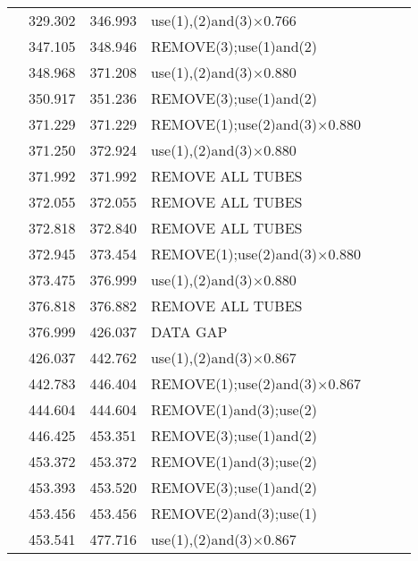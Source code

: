 \begin{table}[!h]
\begin{tabular}{ | c | c | c | p{5.5cm} | c | c | c |}
    &   329.302 &   346.993 &   use(1),(2)and(3)$\times$0.766  &       &       &       \\
    &   347.105 &   348.946 &   REMOVE(3);use(1)and(2)  &       &       &       \\
    &   348.968 &   371.208 &   use(1),(2)and(3)$\times$0.880  &       &       &       \\
    &   350.917 &   351.236 &   REMOVE(3);use(1)and(2)  &       &       &       \\
    &   371.229 &   371.229 &   REMOVE(1);use(2)and(3)$\times$0.880    &       &       &       \\
    &   371.250 &   372.924 &   use(1),(2)and(3)$\times$0.880  &       &       &       \\
    &   371.992 &   371.992 &   REMOVE ALL TUBES    &       &       &       \\
    &   372.055 &   372.055 &   REMOVE ALL TUBES    &       &       &       \\
    &   372.818 &   372.840 &   REMOVE ALL TUBES    &       &       &       \\
    &   372.945 &   373.454 &   REMOVE(1);use(2)and(3)$\times$0.880    &       &       &       \\
    &   373.475 &   376.999 &   use(1),(2)and(3)$\times$0.880  &       &       &       \\
    &   376.818 &   376.882 &   REMOVE ALL TUBES    &       &       &       \\
    &   376.999 &   426.037 &   DATA GAP    &       &       &       \\
    &   426.037 &   442.762 &   use(1),(2)and(3)$\times$0.867  &       &       &       \\
    &   442.783 &   446.404 &   REMOVE(1);use(2)and(3)$\times$0.867    &       &       &       \\
    &   444.604 &   444.604 &   REMOVE(1)and(3);use(2)   &       &       &       \\
    &   446.425 &   453.351 &   REMOVE(3);use(1)and(2)  &       &       &       \\
    &   453.372 &   453.372 &   REMOVE(1)and(3);use(2)   &       &       &       \\
    &   453.393 &   453.520 &   REMOVE(3);use(1)and(2)  &       &       &       \\
    &   453.456 &   453.456 &   REMOVE(2)and(3);use(1)   &       &       &       \\
    &   453.541 &   477.716 &   use(1),(2)and(3)$\times$0.867  &       &       &       \\

\end{tabular}
\end{table}
